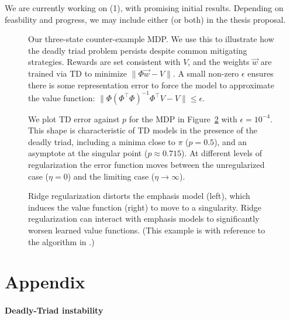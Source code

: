 \documentclass[11pt]{article}
\begin{document}
We are currently working on (1), with promising initial results. Depending on feasbility and progress, we may include either (or both) in the thesis proposal.


\label{sec:deadlytriadnaive}
\begin{figure}[!p]
  
  \caption{Our three-state counter-example MDP. We use this to illustrate how the deadly triad problem persists despite common mitigating strategies. Rewards are set consistent with $V$, and the weights $\vec w$ are trained via TD to minimize $\|\Phi \vec w - V \|$. A small non-zero $\epsilon$ ensures there is some representation error to force the model to approximate the value function: $\|\Phi(\Phi^\top \Phi)^{-1}\Phi^\top V - V \| \leq \epsilon$. }
  \label{fig:mdp}
\end{figure}

\begin{figure}[!p]
    
    \caption{We plot TD error against $p$ for the MDP in Figure~\ref{fig:fixedpoint} with $\epsilon=10^{-4}$. This shape is characteristic of TD models in the presence of the deadly triad, including a minima close to $\pi$ ($p=0.5$), and an asymptote at the singular point ($p\approx 0.715$). At different levels of regularization the error function moves between the unregularized case ($\eta=0$) and the limiting case ($\eta\to\infty$).}
    \label{fig:fixedpoint}
\end{figure}


\begin{figure}
    
    \caption{Ridge regularization distorts the emphasis model (left), which induces the value function (right) to move to a singularity. Ridge regularization can interact with emphasis models to significantly worsen learned value functions. (This example is with reference to the algorithm in \citep{zhang2021breaking}.) }
    \label{fig:emphasisplots}
\end{figure}

\clearpage

\appendix
\section*{Appendix }

\paragraph{Deadly-Triad instability}
\end{document}

